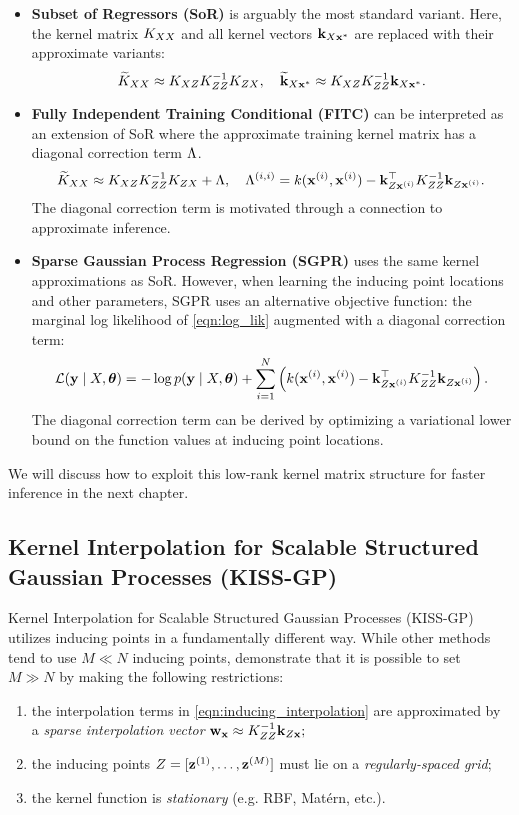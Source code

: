\begin{itemize}
	\item {\bf Subset of Regressors (SoR)} \cite{silverman1985some,smola2001sparse} is arguably the most standard variant.
    Here, the kernel matrix $K_{XX}$ and all kernel vectors $\mathbf{k}_{X\mathbf{x}^*}$ are replaced with their approximate variants:
    \[ \widetilde {K}_{XX} \approx K_{XZ} K_{ZZ}^{-1} K_{ZX}, \quad
       \widetilde {\mathbf{k}}_{X\mathbf{x}^*} \approx K_{XZ} K_{ZZ}^{-1} \mathbf{k}_{X\mathbf{x}^*}. \]

	\item {\bf Fully Independent Training Conditional (FITC) } \cite{snelson2006sparse} can be interpreted as an extension of SoR
		where the approximate training kernel matrix has a diagonal correction term $\Lambda$.
    \[ \widetilde {K}_{XX} \approx K_{XZ} K_{ZZ}^{-1} K_{ZX} + \Lambda, \quad
       \Lambda^{(i,i)} = k(\mathbf{x}^{(i)}, \mathbf{x}^{(i)}) - \mathbf{k}_{Z\mathbf{x}^{(i)}}^\top K_{ZZ}^{-1} \mathbf{k}_{Z\mathbf{x}^{(i)}}. \]
    The diagonal correction term is motivated through a connection to approximate inference.

	\item {\bf Sparse Gaussian Process Regression (SGPR) } \cite{titsias2009variational} uses the same kernel approximations as SoR.
		However, when learning the inducing point locations and other parameters, SGPR uses an alternative objective function:
		the marginal log likelihood of \cref{eqn:log_lik} augmented with a diagonal correction term:
    \[ \mathcal L(\mathbf{y} \mid X, \boldsymbol{\theta}) = -\log p(\mathbf{y} \mid X, \boldsymbol{\theta}) + \sum_{i=1}^N \left( k(\mathbf{x}^{(i)}, \mathbf{x}^{(i)}) - \mathbf{k}_{Z\mathbf{x}^{(i)}}^\top K_{ZZ}^{-1} \mathbf{k}_{Z\mathbf{x}^{(i)}} \right). \]
    The diagonal correction term can be derived by optimizing a variational lower bound on the function values at inducing point locations.
\end{itemize}
%
We will discuss how to exploit this low-rank kernel matrix structure for faster inference in the next chapter.


\subsection{Kernel Interpolation for Scalable Structured Gaussian Processes (KISS-GP)}
\label{sec:kissgp}

Kernel Interpolation for Scalable Structured Gaussian Processes (KISS-GP) \cite{wilson2015kernel} utilizes inducing points in a fundamentally different way.
While other methods tend to use $M \ll N$ inducing points, \citet{wilson2015kernel} demonstrate that it is possible to set $M \gg N$ by making the following restrictions:
\begin{enumerate}
  \item the interpolation terms in \cref{eqn:inducing_interpolation} are approximated by a \emph{sparse interpolation vector} $\mathbf{w}_{\mathbf{x}} \approx K^{-1}_{ZZ} \mathbf{k}_{Z\mathbf{x}};$
  \item the inducing points $Z = [\mathbf{z}^{(1)}, \ldots, \mathbf{z}^{(M)}]$ must lie on a \emph{regularly-spaced grid};
  \item the kernel function is \emph{stationary} (e.g. RBF, Mat\'ern, etc.).
\end{enumerate}

